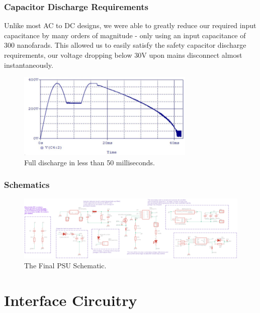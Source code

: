 \documentclass[9pt, technote, a4paper, nofonttune]{IEEEphot}
\begin{document}
        \subsubsection{Capacitor Discharge Requirements}
        \hspace{0.5cm}Unlike most AC to DC designs, we were able to greatly reduce our required input capacitance by many orders of magnitude - only using an input capacitance of 300 nanofarads.  This allowed us to easily satisfy the safety capacitor discharge requirements, our voltage dropping below 30V upon mains disconnect almost 
        instantaneously.
        \begin{figure}[h!]
            \centering
             \includegraphics[width=20pc]{D5/CapDischarge.png}
            \caption{Full discharge in less than 50 milliseconds.}
        \end{figure}
        \subsubsection{Schematics}
        \begin{figure}[h!]
            \centering
             \includegraphics[width=35pc]{D5/Schematics psu.png}
            \caption{The Final PSU Schematic.}
        \end{figure}

\newpage
\section{Interface Circuitry}
\end{document}
